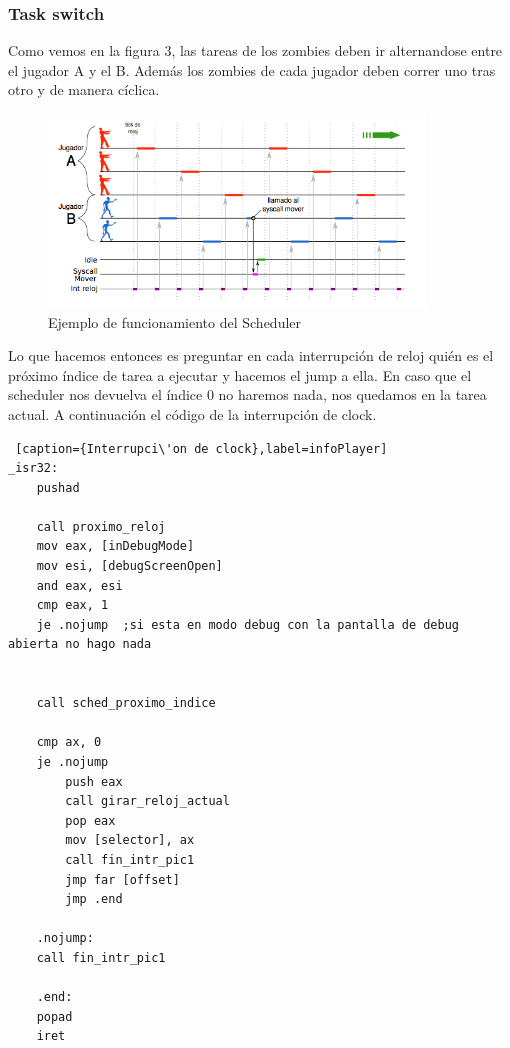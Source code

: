 \newpage

\subsubsection*{Task switch}

\par{Como vemos en la figura 3, las tareas de los zombies deben ir alternandose entre el jugador A y el B. Adem\'as los zombies de cada jugador deben correr uno tras otro y de manera c\'iclica.}

\begin{figure}[ht!]
\centering
\includegraphics[width=100mm]{imagenes/scheduler.png}
\caption{Ejemplo de funcionamiento del Scheduler}
\end{figure}

\par{Lo que hacemos entonces es preguntar en cada interrupci\'on de reloj qui\'en es el pr\'oximo \'indice de tarea a ejecutar y hacemos el jump a ella. En caso que el scheduler nos devuelva el \'indice 0 no haremos nada, nos quedamos en la tarea actual. A continuaci\'on el c\'odigo de la interrupci\'on de clock.}

\begin{lstlisting} [caption={Interrupci\'on de clock},label=infoPlayer]
_isr32:
    pushad

    call proximo_reloj
    mov eax, [inDebugMode] 
    mov esi, [debugScreenOpen]
    and eax, esi
    cmp eax, 1
    je .nojump  ;si esta en modo debug con la pantalla de debug abierta no hago nada


    call sched_proximo_indice

    cmp ax, 0
    je .nojump
        push eax
        call girar_reloj_actual
        pop eax
        mov [selector], ax
        call fin_intr_pic1
        jmp far [offset]
        jmp .end

    .nojump:
    call fin_intr_pic1

    .end:
    popad
    iret
\end{lstlisting}

